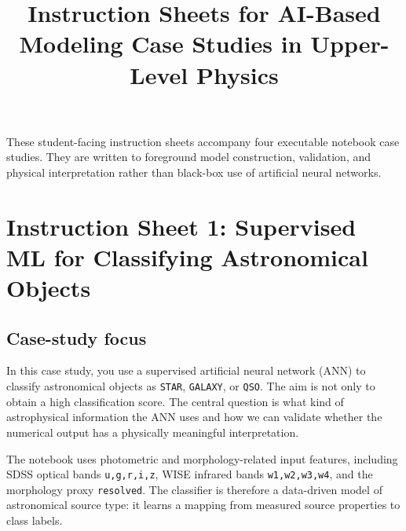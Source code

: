\documentclass[11pt]{article}
\title{Instruction Sheets for AI-Based Modeling Case Studies in Upper-Level Physics}
\author{}
\date{}
\begin{document}
\maketitle

\noindent These student-facing instruction sheets accompany four executable notebook case studies. They are written to foreground model construction, validation, and physical interpretation rather than black-box use of artificial neural networks.



\section*{Instruction Sheet 1: Supervised ML for Classifying Astronomical Objects}

\subsection*{Case-study focus}
In this case study, you use a supervised artificial neural network (ANN) to classify astronomical objects as \texttt{STAR}, \texttt{GALAXY}, or \texttt{QSO}. The aim is not only to obtain a high classification score. The central question is what kind of astrophysical information the ANN uses and how we can validate whether the numerical output has a physically meaningful interpretation.

The notebook uses photometric and morphology-related input features, including SDSS optical bands \texttt{u,g,r,i,z}, WISE infrared bands \texttt{w1,w2,w3,w4}, and the morphology proxy \texttt{resolved}. The classifier is therefore a data-driven model of astronomical source type: it learns a mapping from measured source properties to class labels.
\end{document}
